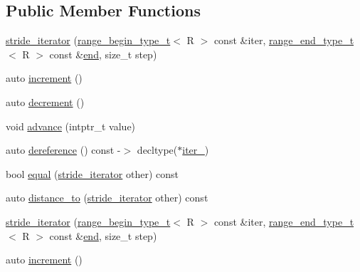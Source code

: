 \subsection*{Public Member Functions}
\begin{DoxyCompactItemize}
\item 
\mbox{\hyperlink{structrah_1_1view_1_1stride__iterator_a47ddd2ce0f295fa825919f04431d64a9}{stride\+\_\+iterator}} (\mbox{\hyperlink{namespacerah_a28aff4eeddcece6be65ff0b956d32d4a}{range\+\_\+begin\+\_\+type\+\_\+t}}$<$ R $>$ const \&iter, \mbox{\hyperlink{namespacerah_a9657e24ae477f4482225b133fe286b65}{range\+\_\+end\+\_\+type\+\_\+t}}$<$ R $>$ const \&\mbox{\hyperlink{namespacerah_a20a3e45aee90bb5534a00c6b14e06069}{end}}, size\+\_\+t step)
\item 
auto \mbox{\hyperlink{structrah_1_1view_1_1stride__iterator_ae98465362884b064db4184a406221154}{increment}} ()
\item 
auto \mbox{\hyperlink{structrah_1_1view_1_1stride__iterator_a8104aed5699a5f26626c8a010a97f5f4}{decrement}} ()
\item 
void \mbox{\hyperlink{structrah_1_1view_1_1stride__iterator_aede4ba99f4ede1afdad678bd0dba4f7b}{advance}} (intptr\+\_\+t value)
\item 
auto \mbox{\hyperlink{structrah_1_1view_1_1stride__iterator_a8db124e5f1f4260387c40336712b1566}{dereference}} () const -\/$>$ decltype($\ast$\mbox{\hyperlink{structrah_1_1view_1_1stride__iterator_ab6d43c096bd4561c737cb7f2b983afb3}{iter\+\_\+}})
\item 
bool \mbox{\hyperlink{structrah_1_1view_1_1stride__iterator_a34c24e935ee7beebcd7269ee314e245a}{equal}} (\mbox{\hyperlink{structrah_1_1view_1_1stride__iterator}{stride\+\_\+iterator}} other) const
\item 
auto \mbox{\hyperlink{structrah_1_1view_1_1stride__iterator_ad30be3983aec3fab52efb32a1a461056}{distance\+\_\+to}} (\mbox{\hyperlink{structrah_1_1view_1_1stride__iterator}{stride\+\_\+iterator}} other) const
\item 
\mbox{\hyperlink{structrah_1_1view_1_1stride__iterator_a47ddd2ce0f295fa825919f04431d64a9}{stride\+\_\+iterator}} (\mbox{\hyperlink{namespacerah_a28aff4eeddcece6be65ff0b956d32d4a}{range\+\_\+begin\+\_\+type\+\_\+t}}$<$ R $>$ const \&iter, \mbox{\hyperlink{namespacerah_a9657e24ae477f4482225b133fe286b65}{range\+\_\+end\+\_\+type\+\_\+t}}$<$ R $>$ const \&\mbox{\hyperlink{namespacerah_a20a3e45aee90bb5534a00c6b14e06069}{end}}, size\+\_\+t step)
\item 
auto \mbox{\hyperlink{structrah_1_1view_1_1stride__iterator_ae98465362884b064db4184a406221154}{increment}} ()

\end{DoxyCompactItemize}
